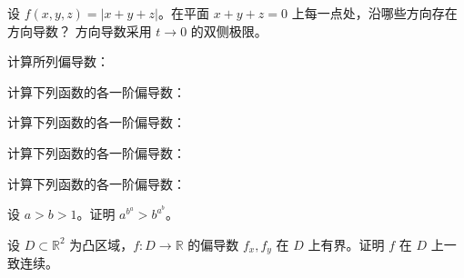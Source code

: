 \newpage
\noindent\begin{minipage}{\textwidth}
设 $f(x,y,z)=|x+y+z|$。在平面 $x+y+z=0$ 上每一点处，沿哪些方向存在方向导数？ 方向导数采用 $t\to0$ 的双侧极限。
\end{minipage}\par\vfill
\noindent\begin{minipage}{\textwidth}
计算所列偏导数：
\end{minipage}\par\vfill
\noindent\begin{minipage}{\textwidth}
计算下列函数的各一阶偏导数：
\end{minipage}\par\vfill
\newpage
\noindent\begin{minipage}{\textwidth}
计算下列函数的各一阶偏导数：
\end{minipage}\par\vfill
\noindent\begin{minipage}{\textwidth}
计算下列函数的各一阶偏导数：
\end{minipage}\par\vfill
\noindent\begin{minipage}{\textwidth}
计算下列函数的各一阶偏导数：
\end{minipage}\par\vfill
\newpage
\noindent\begin{minipage}{\textwidth}
设 $a>b>1$。证明 $a^{b^a}>b^{a^b}$。
\end{minipage}\par\vfill
\noindent\begin{minipage}{\textwidth}
设 $D\subset\mathbb R^2$ 为凸区域，$f:D\to\mathbb R$ 的偏导数 $f_x,f_y$ 在 $D$ 上有界。证明 $f$ 在 $D$ 上一致连续。
\end{minipage}\par\vfill
